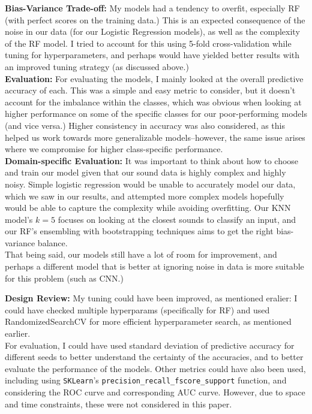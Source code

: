 \documentclass[11pt]{article}
\begin{document}
\noindent \textbf{Bias-Variance Trade-off:} My models had a tendency to overfit, especially RF (with perfect scores on the training data.) This is an expected consequence of the noise in our data (for our Logistic Regression models), as well as the complexity of the RF model. I tried to account for this using 5-fold cross-validation while tuning for hyperparameters, and perhaps would have yielded better results with an improved tuning strategy (as discussed above.)\\

\noindent \textbf{Evaluation:} For evaluating the models, I mainly looked at the overall predictive accuracy of each. This was a simple and easy metric to consider, but it doesn't account for the imbalance within the classes, which was obvious when looking at higher performance on some of the specific classes for our poor-performing models (and vice versa.) Higher consistency in accuracy was also considered, as this helped us work towards more generalizable models--however, the same issue arises where we compromise for higher class-specific performance.\\

\noindent \textbf{Domain-specific Evaluation:} It was important to think about how to choose and train our model given that our sound data is highly complex and highly noisy. Simple logistic regression would be unable to accurately model our data, which we saw in our results, and attempted more complex models hopefully would be able to capture the complexity while avoiding overfitting. Our KNN model's $k=5$ focuses on looking at the closest sounds to classify an input, and our RF's ensembling with bootstrapping techniques aims to get the right bias-variance balance.\\

\noindent That being said, our models still have a lot of room for improvement, and perhaps a different model that is better at ignoring noise in data is more suitable for this problem (such as CNN.)

\noindent \textbf{Design Review:}
My tuning could have been improved, as mentioned eralier: I could have checked multiple hyperparams (specifically for RF) and used RandomizedSearchCV for more efficient hyperparameter search, as mentioned earlier.\\

\noindent For evaluation, I could have used standard deviation of predictive accuracy for different seeds to better understand the certainty of the accuracies, and to better evaluate the performance of the models. Other metrics could have also been used, including using \texttt{SKLearn}'s \texttt{precision\_recall\_fscore\_support} function, and considering the ROC curve and corresponding AUC curve. However, due to space and time constraints, these were not considered in this paper.\\
\end{document}
